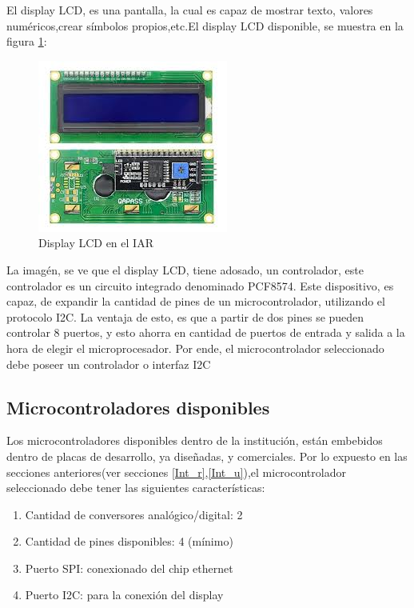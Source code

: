 El display LCD, es una pantalla, la cual es capaz de mostrar texto, valores numéricos,crear símbolos propios,etc.El display LCD disponible, se muestra en la figura \ref{fig:LCD_r}: 
\begin{figure}[ht]
	\centering
	\includegraphics{dispLCD} 
	\caption{Display LCD en el IAR}
	\label{fig:LCD_r}
\end{figure}

La imagén, se ve que el display LCD, tiene adosado, un controlador, este controlador es un circuito integrado denominado PCF8574. Este dispositivo, es capaz, de expandir la cantidad de pines de un microcontrolador, utilizando el protocolo I2C. La ventaja de esto, es que a partir de dos pines se pueden controlar 8 puertos, y esto ahorra en cantidad de puertos de entrada y salida a la hora de elegir el microprocesador. Por ende, el microcontrolador seleccionado debe poseer un controlador o interfaz I2C   



\subsection{Microcontroladores disponibles}  

Los microcontroladores disponibles dentro de la institución, están embebidos dentro de placas de desarrollo, ya diseñadas, y comerciales. Por lo expuesto en las secciones anteriores(ver secciones \ref{Int_r},\ref{Int_u}),el microcontrolador seleccionado debe tener las siguientes características:

\begin{enumerate}
	\item Cantidad de conversores analógico/digital: 2
	\item Cantidad de pines disponibles: 4 (mínimo) 
	\item Puerto SPI: conexionado del chip ethernet
	\item Puerto I2C: para la conexión del display 
\end{enumerate}

